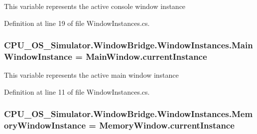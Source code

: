 This variable represents the active console window instance 



Definition at line 19 of file Window\+Instances.\+cs.

\hypertarget{class_c_p_u___o_s___simulator_1_1_window_bridge_1_1_window_instances_a130a2c32e8ccfd51a42ecb363fbb42cc}{}
\subsubsection[{Main\+Window\+Instance}]{ C\+P\+U\+\_\+\+O\+S\+\_\+\+Simulator.\+Window\+Bridge.\+Window\+Instances.\+Main\+Window\+Instance = {\bf Main\+Window.\+current\+Instance}\hspace{0.3cm}{\ttfamily [static]}}\label{class_c_p_u___o_s___simulator_1_1_window_bridge_1_1_window_instances_a130a2c32e8ccfd51a42ecb363fbb42cc}


This variable represents the active main window instance 



Definition at line 11 of file Window\+Instances.\+cs.

\hypertarget{class_c_p_u___o_s___simulator_1_1_window_bridge_1_1_window_instances_a401fd485bde830472a1a960a25ec1464}{}
\subsubsection[{Memory\+Window\+Instance}]{ C\+P\+U\+\_\+\+O\+S\+\_\+\+Simulator.\+Window\+Bridge.\+Window\+Instances.\+Memory\+Window\+Instance = {\bf Memory\+Window.\+current\+Instance}\hspace{0.3cm}{\ttfamily [static]}}\label{class_c_p_u___o_s___simulator_1_1_window_bridge_1_1_window_instances_a401fd485bde830472a1a960a25ec1464}


